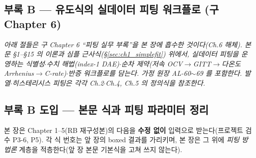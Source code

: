 \subsection*{\normalfont\Large 부록 B — 유도식의 실데이터 피팅 워크플로 (구 Chapter 6)}
\label{sec:ch1_fitting_practice}
\noindent\emph{아래 절들은 구 Chapter 6 ``피팅 실무 부록''을 본 장에 흡수한 것이다(Ch.6 해체). 본문 \S1--\S15 의 이론과 심플 근사식(\S\ref{sec:ch1_simplefit}) 위에서, 실데이터 피팅을 운영하는 식별성$\cdot$수치 해법(index-1 DAE)$\cdot$순차 제약(저속 OCV$\to$GITT$\to$다온도 Arrhenius$\to$C-rate)$\cdot$반증 워크플로를 담는다. 가정 원장 AL-60$\sim$69 를 포함한다. 발열$\cdot$히스테리시스 피팅은 각각 Ch.2$\cdot$Ch.4, Ch.5 의 정의식을 참조한다.}
\subsection{부록 B 도입 — 본문 식과 피팅 파라미터 정리}\label{sec:ch6_inherit}
본 장은 Chapter 1--5(RB 재구성본)의 다음을 \textbf{수정 없이} 입력으로 받는다(프로젝트 검수 P3-6, P5). 각 식
번호는 앞 장의 boxed 결과를 가리키며, 본 장은 그 위에 \emph{피팅 방법론} 계층을 적층한다(앞 장 본문 기본식을
고쳐 쓰지 않는다).
